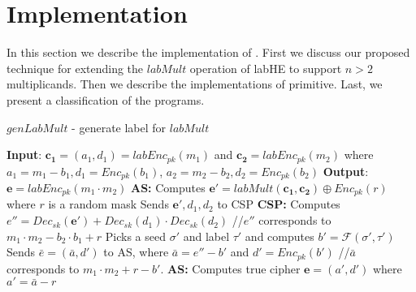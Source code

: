 \section{Implementation}\label{sec:implementaion}
\label{implementation}
In this section we describe the implementation of \system. First we discuss our proposed technique for extending the $labMult$ operation of \textsf{labHE} to support $n > 2$ multiplicands. Then we describe the implementations of \system primitive. Last, we present a  classification of the \system programs. 
\begin{algorithm}[b]
\caption{$genLabMult$ - generate label for $labMult$}\label{algo:genlabmult}
\small
\begin{algorithmic}[1]
\STATEx
\textbf{Input}: $\mathbf{c_1}=(a_1,d_1)=labEnc_{pk}(m_1)$ and $\mathbf{c_2}=labEnc_{pk}(m_2)$ 
\STATEx where $a_1= m_1-b_1, d_1=Enc_{pk}(b_1)$, $a_2= m_2-b_2, d_2=Enc_{pk}(b_2)$
\STATEx \textbf{Output}: $\mathbf{e}=labEnc_{pk}(m_1\cdot m_2)$
\STATEx \textbf{\textsf{AS}:} 
\STATE Computes $\textbf{e}'=labMult(\mathbf{c_1,c_2}) \oplus Enc_{pk}(r)$ where $r$ is a random mask 
\STATE Sends $\mathbf{e'},d_1,d_2$ to \textsf{CSP}
\STATEx \textbf{\textsf{CSP}:}
\STATE Computes $e''= Dec_{sk}(\mathbf{e'}) + Dec_{sk}(d_1)\cdot Dec_{sk}(d_2)$
\STATEx //$e''$ corresponds to $m_1\cdot m_2 -b_2\cdot b_1 + r$ 
\STATE Picks a seed $\sigma'$ and label $\tau'$ and computes $b'=\mathcal{F}(\sigma',\tau')$ 
\STATE Sends $\bar{e}=(\bar{a},d')$ to \textsf{AS}, where $\bar{a} = e''-b'$ and $d' = Enc_{pk}(b')$
\STATEx //$\bar{a}$ corresponds to $m_1\cdot m_2 + r-b'$.
\STATEx \textbf{\textsf{AS}:}
\STATE Computes true cipher $\mathbf{e}=(a',d')$ where $a'=\bar{a}-r$ %
 \end{algorithmic}
\end{algorithm}


